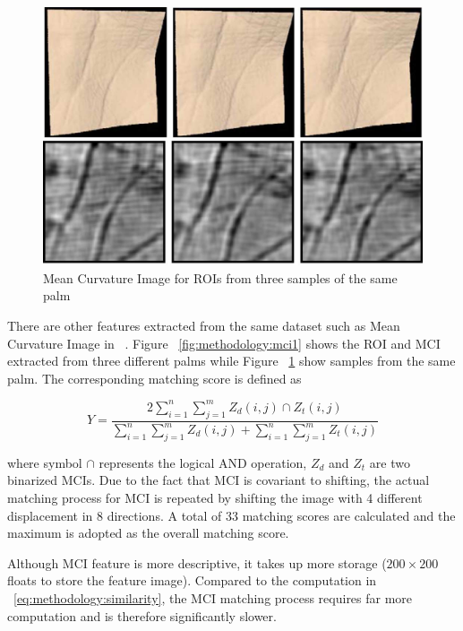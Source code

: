 \begin{figure}[htb]
  \begin{center}
    \includegraphics[width=0.9\linewidth]{ch-methodology/figures/mci2}
    \caption[MCI for ROIs from the same palm]{Mean Curvature Image for ROIs from three samples of the same palm}    \label{fig:methodology:mci2}
  \end{center}
\end{figure}

There are other features extracted from the same dataset such as Mean Curvature Image in ~\cite{Zhang:2009dp}. Figure ~\ref{fig:methodology:mci1} shows the ROI and MCI extracted from three different palms while Figure ~\ref{fig:methodology:mci2} show samples from the same palm. The corresponding matching score is defined as

\begin{equation}
Y=\frac{
    2\sum \limits_{i=1}^{n} \sum \limits_{j=1}^{m} Z_d(i,j) \cap Z_t(i,j)
}
{
    \sum \limits_{i=1}^{n} \sum \limits_{j=1}^{m} Z_d(i,j) +
    \sum \limits_{i=1}^{n} \sum \limits_{j=1}^{m} Z_t(i,j)
}
\end{equation}

where symbol $\cap$ represents the logical AND operation, $Z_d$ and $Z_t$ are two binarized MCIs. Due to the fact that MCI is covariant to shifting, the actual matching process for MCI is repeated by shifting the image with 4 different displacement in 8 directions. A total of 33 matching scores are calculated and the maximum is adopted as the overall matching score.

Although MCI feature is more descriptive, it takes up more storage ($200\times200$ floats to store the feature image). Compared to the computation in ~\ref{eq:methodology:similarity}, the MCI matching process requires far more computation and is therefore significantly slower.
